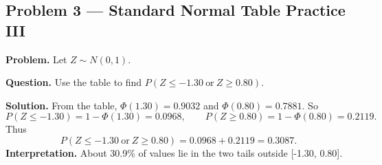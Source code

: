 \begin{ExamProblems}
		
		\hypertarget{c5-ex3}{}
		\item
		\subsection*{Problem 3 — Standard Normal Table Practice III}
		
		\textbf{Problem.}
		Let \(Z\sim N(0,1)\).
		
		\textbf{Question.} Use the table to find \(P(Z\le -1.30\ \text{or}\ Z\ge 0.80)\).
		
		\textbf{Solution.}
		From the table, \(\Phi(1.30)=0.9032\) and \(\Phi(0.80)=0.7881\).
		So
		\[
		P(Z\le -1.30)=1-\Phi(1.30)=0.0968,
		\qquad P(Z\ge 0.80)=1-\Phi(0.80)=0.2119.
		\]
		Thus
		\[
		P(Z\le -1.30\ \text{or}\ Z\ge 0.80)=0.0968+0.2119=0.3087.
		\]
		\textbf{Interpretation.} About 30.9\% of values lie in the two tails outside [-1.30, 0.80].
		
	\end{ExamProblems}
	
	
